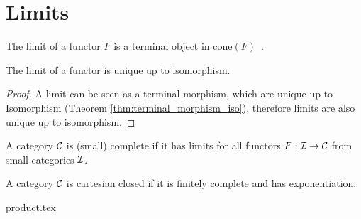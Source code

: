 \section{Limits}

\begin{definition}[Limit]

	The limit of a functor $F$ is a terminal object in
	$\mathrm{cone}(F)$~\parencite[p.~118]{leinster:basic_category_theory}.
\end{definition}

\begin{theorem}\label{thm:limit_iso}
	The limit of a functor is unique up to isomorphism.

	\begin{proof}
		A limit can be seen as a terminal morphism, which are unique up to
		Isomorphism (Theorem \ref{thm:terminal_morphism_iso}), therefore limits are
		also unique up to isomorphism.
	\end{proof}
\end{theorem}

\begin{definition}
	A category $\mathcal{C}$ is (small) complete if it has limits for all functors $F:\mathcal{I}
	\to \mathcal{C}$ from small categories $\mathcal{I}$.
\end{definition}

\begin{definition} A
	category $\mathcal{C}$ is cartesian closed if it is finitely complete and has
	exponentiation.
\end{definition}

{product.tex}



